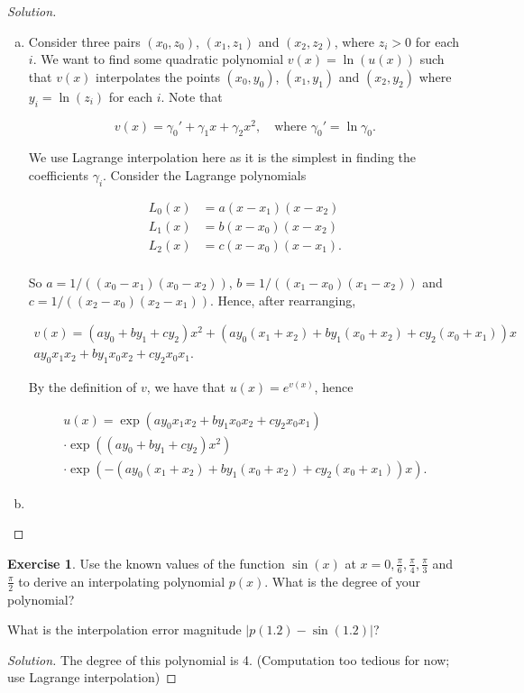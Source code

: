 \documentclass[12pt,a4]{article}
\theoremstyle{definition}
\newtheorem{exercise}{Exercise}
\begin{document}
\begin{proof}[Solution]
	\begin{enumerate}[(a)]
		\item Consider three pairs $(x_0, z_0)$, $(x_1, z_1)$ and $(x_2, z_2)$, where $z_i > 0$ for each $i$. We want to find some quadratic polynomial $v(x) = \ln(u(x))$ such that $v(x)$ interpolates the points $(x_0, y_0)$, $(x_1, y_1)$ and $(x_2, y_2)$ where $y_i = \ln(z_i)$ for each $i$. Note that
		
		\[
		v(x) = \gamma_0' + \gamma_1 x + \gamma_2 x^2 {,} \quad \text{where } \gamma_0' = \ln{\gamma_0} {.}
		\]
		
		We use Lagrange interpolation here as it is the simplest in finding the coefficients $\gamma_i$. Consider the Lagrange polynomials 
		
		\begin{align*}
		L_0(x) &= a (x - x_1) (x - x_2) \\
		L_1(x) &= b (x - x_0) (x - x_2) \\
		L_2(x) &= c (x - x_0) (x - x_1) {.} \\
		\end{align*}
		
		So $a = 1 / ((x_0 - x_1)(x_0 - x_2))$, $b = 1 / ((x_1 - x_0)(x_1 - x_2))$ and $c = 1 / ((x_2 - x_0)(x_2 - x_1))$. Hence, after rearranging, 
		
		\begin{gather*}
		v(x) = (a y_0 + b y_1 + c y_2) x^2 + (a y_0 (x_1 + x_2) + b y_1 (x_0 + x_2) + c y_2 (x_0 + x_1)) x \\
		a y_0 x_1 x_2 + b y_1 x_0 x_2 + c y_2 x_0 x_1 {.}
		\end{gather*}
		
		By the definition of $v$, we have that $u(x) = e^{v(x)}$, hence 
		
		\begin{gather*}
		u(x) = \exp{(a y_0 x_1 x_2 + b y_1 x_0 x_2 + c y_2 x_0 x_1)} \\
		 \cdot \exp{((a y_0 + b y_1 + c y_2) x^2)} \\
		 \cdot \exp{(-(a y_0 (x_1 + x_2) + b y_1 (x_0 + x_2) + c y_2 (x_0 + x_1)) x)} {.}
		\end{gather*}
		
		\item 
	\end{enumerate}
\end{proof}

\begin{exercise}
	Use the known values of the function $\sin(x)$ at $x = 0, \frac{\pi}{6}, \frac{\pi}{4}, \frac{\pi}{3}$ and $\frac{\pi}{2}$ to derive an interpolating polynomial $p(x)$. What is the degree of your polynomial?
	
	\noindent What is the interpolation error magnitude $|p(1.2) - \sin(1.2)|$?
\end{exercise}
\begin{proof}[Solution]
	The degree of this polynomial is 4. (Computation too tedious for now; use Lagrange interpolation)
\end{proof}
\end{document}
